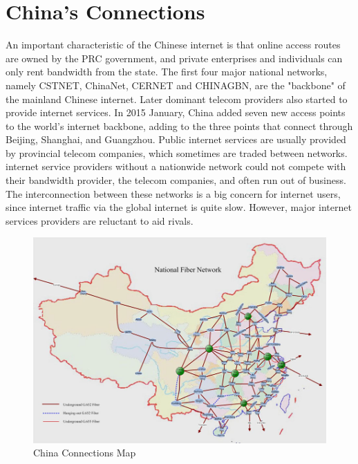 \documentclass[10pt,conference,a4paper]{IEEEtran}%
\begin{document}
\section{China's Connections}
An important characteristic of the Chinese internet is that online access routes are owned by the PRC government, and private enterprises and individuals can only rent bandwidth from the state. The first four major national networks, namely CSTNET, ChinaNet, CERNET and CHINAGBN, are the "backbone" of the mainland Chinese internet. Later dominant telecom providers also started to provide internet services.
In 2015 January, China added seven new access points to the world’s internet backbone, adding to the three points that connect through Beijing, Shanghai, and Guangzhou.
Public internet services are usually provided by provincial telecom companies, which sometimes are traded between networks. internet service providers without a nationwide network could not compete with their bandwidth provider, the telecom companies, and often run out of business. The interconnection between these networks is a big concern for internet users, since internet traffic via the global internet is quite slow. However, major internet services providers are reluctant to aid rivals.

\begin{figure}[htb]
	\centering
		\includegraphics[width=\columnwidth]{images/map.jpg}
		\caption{China Connections Map}
	\label{fig:graph}
\end{figure}
\end{document}
